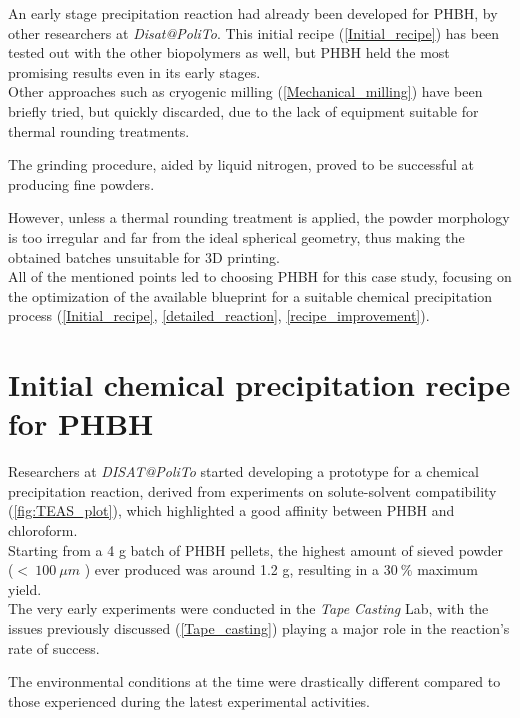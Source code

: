 \documentclass{article}
\begin{document}
    An early stage precipitation reaction had already been developed for PHBH, by other researchers at \textit{Disat@PoliTo}. 
    This initial recipe (\ref{Initial_recipe}) has been tested out with the other biopolymers as well, but PHBH held the most promising 
    results even in its early stages. \\ 

    Other approaches such as cryogenic milling (\ref{Mechanical_milling}) have been briefly tried, but quickly 
    discarded, due to the lack of equipment suitable for thermal rounding treatments. 

    The grinding procedure, aided by liquid nitrogen, proved to be successful at producing fine powders. 

    However, unless a thermal rounding treatment is applied, the powder 
    morphology is too irregular and far from the ideal spherical geometry, thus making the 
    obtained batches unsuitable for 3D printing. \\  

    All of the mentioned points led to choosing PHBH for this case study, focusing on the optimization of 
    the available blueprint for a suitable chemical 
    precipitation process (\ref{Initial_recipe}, \ref{detailed_reaction}, \ref{recipe_improvement}). 

    \clearpage
    \section{Initial chemical precipitation recipe for PHBH\label{Initial_recipe}}
    
    Researchers at \textit{DISAT@PoliTo} started developing a prototype for a chemical precipitation reaction, 
    derived from experiments on solute-solvent compatibility (\ref{fig:TEAS_plot}), 
    which highlighted a good affinity between PHBH and chloroform. \\ 

    Starting from a 4 g batch of PHBH pellets, the highest amount of sieved powder ($ < \ 100 \ \mu m$ )
    ever produced was around 1.2 g, resulting in a $30 \ \% $ maximum yield. \\ 

    The very early experiments were conducted in the \textit{Tape Casting} Lab, with the issues previously discussed 
    (\ref{Tape_casting}) playing a major role in the reaction's rate of success. 
    
    The environmental conditions at the time were drastically different compared to those experienced during the latest experimental 
    activities. 
\end{document}
